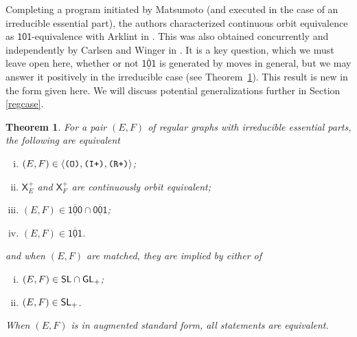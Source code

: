\documentclass[12pt]{amsbook}%
\newcommand{\XXp}[1]{\mathsf X^+_{#1}}
\newtheorem{theor}{Theorem}[section]
\theoremstyle{defin}
\theoremstyle{remark}
\numberwithin{equation}{chapter}
\numberwithin{theor}{section}
\newcommand{\xyz}[1]{\mbox{$\mathsf{#1}$}}
\newcommand{\xyzrel}[1]{\mbox{$\overline{\underline{\mathsf{ #1}}}$}}
\newcommand{\IIIp}{\mbox{\texttt{\textup{(I+)}}}}
\newcommand{\OOO}{\mbox{\texttt{\textup{(O)}}}}
\newcommand{\RRRp}{\mbox{\texttt{\textup{(R+)}}}}
\newcommand{\SL}{{\sf SL}}
\newcommand{\SLp}{\mbox{${\sf SL}_+$}}
\newcommand{\GLp}{\mbox{${\sf GL}_+$}}
\begin{document}
Completing a program initiated by Matsumoto (and executed in the case of an irreducible essential part), the authors characterized continuous orbit equivalence as \xyz{101}-equivalence with Arklint in \cite{seaseer:dcdpgc}. This was also obtained concurrently and independently by Carlsen and Winger in 
\cite{tmcmlw:oegigg}. It is a key question, which we must leave open here, whether or not \xyzrel{101} is generated by moves in general, but we may answer it positively in the irreducible case (see Theorem~\ref{MCEORhere}).  This result is new in the form given here. We will discuss potential generalizations further in Section \ref{regcase}.  



   \begin{theor}\label{MCEORhere}
  For a pair $(E,F)$ of regular graphs with irreducible essential parts, the following are equivalent
  \begin{enumerate}[(i)]
\item $(E,F)\in\langle \OOO,\IIIp,\RRRp\rangle$;
   \item $\XXp E$ and $\XXp F$ are continuously orbit equivalent;
  \item $(E,F)\in\xyzrel{100}\cap \xyzrel{001}$;
  \item $(E,F)\in\xyzrel{101}$.
    \end{enumerate}
and  when $(E,F)$ are matched, they are implied by either of
    \begin{enumerate}[(i)]\addtocounter{enumi}{4}
  \item $(E,F)\in \SL\cap \GLp$; %
  \item $(E,F)\in \SLp$. %
    \end{enumerate}
    When $(E,F)$ is in augmented standard form, all statements are equivalent.
  \end{theor}
\end{document}
